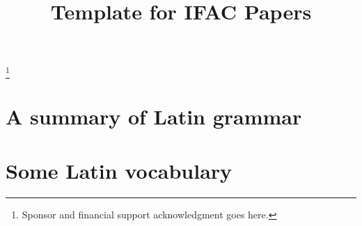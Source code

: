 \documentclass{ifacconf}
\begin{document}
	
	\begin{frontmatter}
	
		\title{Template for IFAC Papers }
		
		\thanks[footnoteinfo]{Sponsor and financial support acknowledgment
			goes here.}
	
		
	
		
	
	\end{frontmatter}
	
	
	
		
	
	
	
	
	
	
	
	
	
	
	
	
	
	
	
	
	
	
	
	
	
	
	\nocite{*}
	
	
	
	\appendix
	\section{A summary of Latin grammar}    %
	\section{Some Latin vocabulary}         %
	
	
\end{document}
